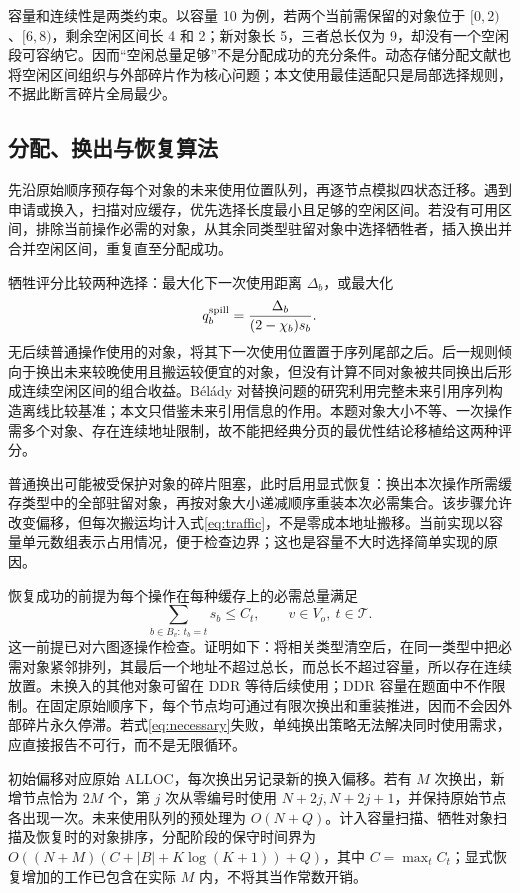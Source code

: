 容量和连续性是两类约束。以容量 10 为例，若两个当前需保留的对象位于 $[0,2)$、$[6,8)$，剩余空闲区间长 4 和 2；新对象长 5，三者总长仅为 9，却没有一个空闲段可容纳它。因而“空闲总量足够”不是分配成功的充分条件。动态存储分配文献也将空闲区间组织与外部碎片作为核心问题\cite{wilson}；本文使用最佳适配只是局部选择规则，不据此断言碎片全局最少。

\subsection{分配、换出与恢复算法}
先沿原始顺序预存每个对象的未来使用位置队列，再逐节点模拟四状态迁移。遇到申请或换入，扫描对应缓存，优先选择长度最小且足够的空闲区间。若没有可用区间，排除当前操作必需的对象，从其余同类型驻留对象中选择牺牲者，插入换出并合并空闲区间，重复直至分配成功。

牺牲评分比较两种选择：最大化下一次使用距离 $\Delta_b$，或最大化
\begin{equation}
q_b^{\rm spill}=\frac{\Delta_b}{(2-\chi_b)s_b}.\label{eq:victim}
\end{equation}
无后续普通操作使用的对象，将其下一次使用位置置于序列尾部之后。后一规则倾向于换出未来较晚使用且搬运较便宜的对象，但没有计算不同对象被共同换出后形成连续空闲区间的组合收益。Bélády 对替换问题的研究利用完整未来引用序列构造离线比较基准\cite{belady}；本文只借鉴未来引用信息的作用。本题对象大小不等、一次操作需多个对象、存在连续地址限制，故不能把经典分页的最优性结论移植给这两种评分。

普通换出可能被受保护对象的碎片阻塞，此时启用显式恢复：换出本次操作所需缓存类型中的全部驻留对象，再按对象大小递减顺序重装本次必需集合。该步骤允许改变偏移，但每次搬运均计入式\eqref{eq:traffic}，不是零成本地址搬移。当前实现以容量单元数组表示占用情况，便于检查边界；这也是容量不大时选择简单实现的原因。

恢复成功的前提为每个操作在每种缓存上的必需总量满足
\begin{equation}
\sum_{b\in B_v:\,t_b=t}s_b\le C_t,\qquad v\in V_o,\ t\in\mathcal T.\label{eq:necessary}
\end{equation}
这一前提已对六图逐操作检查。证明如下：将相关类型清空后，在同一类型中把必需对象紧邻排列，其最后一个地址不超过总长，而总长不超过容量，所以存在连续放置。未换入的其他对象可留在 DDR 等待后续使用；DDR 容量在题面中不作限制。在固定原始顺序下，每个节点均可通过有限次换出和重装推进，因而不会因外部碎片永久停滞。若式\eqref{eq:necessary}失败，单纯换出策略无法解决同时使用需求，应直接报告不可行，而不是无限循环。

初始偏移对应原始 ALLOC，每次换出另记录新的换入偏移。若有 $M$ 次换出，新增节点恰为 $2M$ 个，第 $j$ 次从零编号时使用 $N+2j,N+2j+1$，并保持原始节点各出现一次。未来使用队列的预处理为 $O(N+Q)$。计入容量扫描、牺牲对象扫描及恢复时的对象排序，分配阶段的保守时间界为 $O((N+M)(C+|B|+K\log(K+1))+Q)$，其中 $C=\max_tC_t$；显式恢复增加的工作已包含在实际 $M$ 内，不将其当作常数开销。

